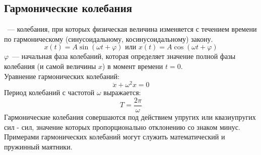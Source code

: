 \subsection{Гармонические колебания}
~--- колебания, при которых физическая величина изменяется с течением времени по гармоническому (синусоидальному, косинусоидальному) закону.
\begin{equation}
x(t) = A \sin (\omega t + \varphi) \text { или } x(t) = A \cos (\omega t + \varphi)
\end{equation}
$\varphi$~--- начальная фаза колебаний, которая определяет значение полной фазы колебания (и самой величины $x$) в момент времени $t = 0$.\\
Уравнение гармонических колебаний:
\begin{equation}
\ddot{x} + \omega^2 x = 0
\end{equation}
Период колебаний с частотой $\omega$ выражается:
\begin{equation}
T = \frac{2 \pi}{\omega}
\end{equation}
Гармонические колебания совершаются под действием упругих или квазиупругих сил - сил, значение которых пропорционально отклонению со знаком минус. Примерами гармонических колебаний могут служить математический и пружинный маятники.